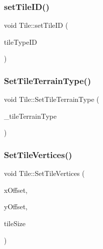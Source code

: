 \mbox{\label{class_tile_a833ab61d8e2bf2ed210c25ebf9e58f0a}} 
\subsubsection{\texorpdfstring{set\+Tile\+I\+D()}{setTileID()}}
{\footnotesize\ttfamily void Tile\+::set\+Tile\+ID (\begin{DoxyParamCaption}\item[{int}]{tile\+Type\+ID }\end{DoxyParamCaption})}

\mbox{\label{class_tile_a611e25f67b8504a33f373893e26e902c}} 
\subsubsection{\texorpdfstring{Set\+Tile\+Terrain\+Type()}{SetTileTerrainType()}}
{\footnotesize\ttfamily void Tile\+::\+Set\+Tile\+Terrain\+Type (\begin{DoxyParamCaption}\item[{\mbox{\hyperlink{_enum_types_8hpp_a462b3f8c270b48544fc9c2e167a3f6e5}{Tile\+Terrain\+Type}}}]{\+\_\+tile\+Terrain\+Type }\end{DoxyParamCaption})}

\mbox{\label{class_tile_ae04b87313b96914391ca2ffc2eb9f5c1}} 
\subsubsection{\texorpdfstring{Set\+Tile\+Vertices()}{SetTileVertices()}}
{\footnotesize\ttfamily void Tile\+::\+Set\+Tile\+Vertices (\begin{DoxyParamCaption}\item[{int}]{x\+Offset,  }\item[{int}]{y\+Offset,  }\item[{sf\+::\+Vector2i}]{tile\+Size }\end{DoxyParamCaption})}

